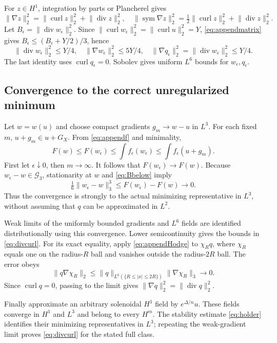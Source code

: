 \documentclass[11pt,a4paper]{article}
\theoremstyle{definition}\newtheorem{definition}[theorem]{Definition}
\theoremstyle{remark}\newtheorem{remark}[theorem]{Remark}
\newcommand{\G}{\mathcal G_3}
\newcommand{\norm}[1]{\lVert #1\rVert}
\newcommand{\diver}{\operatorname{div}}
\newcommand{\curl}{\operatorname{curl}}
\newcommand{\sym}{\operatorname{sym}}
\numberwithin{equation}{section}
\begin{document}
For $z\in H^1$, integration by parts or Plancherel gives
\begin{equation}\label{eq:appendHodge}
 \norm{\nabla z}_2^2=\norm{\curl z}_2^2+\norm{\diver z}_2^2,
 \quad
 \norm{\sym\nabla z}_2^2=\tfrac12\norm{\curl z}_2^2+\norm{\diver z}_2^2.
\end{equation}
Let $B_\epsilon=\norm{\diver w_\epsilon}_2^2$. Since
$\norm{\curl w_\epsilon}_2^2=\norm{\curl u}_2^2=Y$, \eqref{eq:appendmatrix} gives
$B_\epsilon\le(B_\epsilon+Y/2)/3$, hence
\begin{equation}\label{eq:appenduniform}
 \norm{\diver w_\epsilon}_2^2\le Y/4,\quad
 \norm{\nabla w_\epsilon}_2^2\le5Y/4,\quad
 \norm{\nabla q_\epsilon}_2^2=\norm{\diver w_\epsilon}_2^2\le Y/4.
\end{equation}
The last identity uses $\curl q_\epsilon=0$. Sobolev gives uniform $L^6$ bounds for $w_\epsilon,q_\epsilon$.

\subsection{Convergence to the correct unregularized minimum}
Let $w=w(u)$ and choose compact gradients $g_m\to w-u$ in $L^3$. For each fixed $m$, $u+g_m\in u+G_X$. From \eqref{eq:appendf} and minimality,
\[
 F(w)\le F(w_\epsilon)\le\int f_\epsilon(w_\epsilon)
 \le\int f_\epsilon(u+g_m).
\]
First let $\epsilon\downarrow0$, then $m\to\infty$. It follows that $F(w_\epsilon)\to F(w)$. Because $w_\epsilon-w\in\G$, stationarity at $w$ and \eqref{eq:Bbelow} imply
\[
 \tfrac16\norm{w_\epsilon-w}_3^3
 \le F(w_\epsilon)-F(w)\longrightarrow0.
\]
Thus the convergence is strongly to the actual minimizing representative in $L^3$, without assuming that $q$ can be approximated in $L^2$.

Weak limits of the uniformly bounded gradients and $L^6$ fields are identified distributionally using this convergence. Lower semicontinuity gives the bounds in \eqref{eq:divcurl}. For its exact equality, apply \eqref{eq:appendHodge} to $\chi_Rq$, where $\chi_R$ equals one on the radius-$R$ ball and vanishes outside the radius-$2R$ ball. The error obeys
\[
 \norm{q\nabla\chi_R}_2
 \le\norm q_{L^6(\{R\le|x|\le2R\})}\norm{\nabla\chi_R}_3\to0.
\]
Since $\curl q=0$, passing to the limit gives
$\norm{\nabla q}_2^2=\norm{\diver q}_2^2$.

Finally approximate an arbitrary solenoidal $H^1$ field by $e^{\Delta/n}u$. These fields converge in $H^1$ and $L^3$ and belong to every $H^m$. The stability estimate \eqref{eq:holder} identifies their minimizing representatives in $L^3$; repeating the weak-gradient limit proves \eqref{eq:divcurl} for the stated full class.
\end{document}
